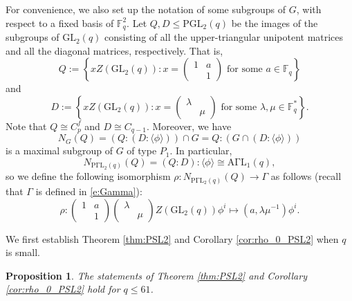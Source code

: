 \documentclass[twoside,a4paper,reqno,11pt]{amsart}
\newcommand{\<}{\langle}
\renewcommand{\>}{\rangle}
\newcommand{\la}{\langle}
\newcommand{\ra}{\rangle}
\renewcommand{\to}{\rightarrow}
\newcommand{\leqs}{\leqslant}
\newcommand{\GL}{\mathrm{GL}}
\newcommand{\PGL}{\mathrm{PGL}}
\newcommand{\PGammaL}{\mathrm{P\Gamma L}}
\newtheorem{prop}[thm]{Proposition}
\theoremstyle{definition}
\begin{document}
	For convenience, we also set up the notation of some subgroups of $G$, with respect to a fixed basis of $\mathbb{F}_q^2$. Let $Q,D\leqs \PGL_2(q)$ be the images of the subgroups of $\GL_2(q)$ consisting of all the upper-triangular unipotent matrices and all the diagonal matrices, respectively. That is,
	\begin{equation}
	\label{e:Q}
	Q:=\left\{xZ(\GL_2(q)):x =
	\begin{pmatrix}
	1&a\\
	&1
	\end{pmatrix}
	\mbox{ for some }a\in\mathbb{F}_q
	\right\}
	\end{equation}
	and
	\begin{equation}
	\label{e:D}
	D:=\left\{xZ(\GL_2(q)):x =
	\begin{pmatrix}
	\lambda&\\
	&\mu
	\end{pmatrix}
	\mbox{ for some }\lambda,\mu\in\mathbb{F}_q^*
	\right\}.
	\end{equation}
	Note that $Q\cong C_p^f$ and $D\cong C_{q-1}$. Moreover, we have
	\begin{equation*}
	N_{G}(Q) = (Q{:}(D{:}\la \phi\ra))\cap G = Q{:}(G\cap (D{:}\la \phi\ra))
	\end{equation*}
	is a maximal subgroup of $G$ of type $P_1$. In particular,
	\begin{equation*}
	N_{\PGammaL_2(q)}(Q) = (Q{:}D){:}\la\phi\ra\cong\mathrm{A\Gamma L}_1(q),
	\end{equation*}
	so we define the following isomorphism $\rho:N_{\PGammaL_2(q)}(Q)\to \Gamma$ as follows (recall that $\Gamma$ is defined in \eqref{e:Gamma}):
	\begin{equation}
	\label{e:pi}
	\rho:
	\begin{pmatrix}
	1&a\\
	&1
	\end{pmatrix}
	\begin{pmatrix}
	\lambda&\\
	&\mu
	\end{pmatrix}
	Z(\GL_2(q))\phi^i\mapsto (a,\lambda\mu^{-1})\phi^i.
	\end{equation}
	
	We first establish Theorem \ref{thm:PSL2} and Corollary \ref{cor:rho_0_PSL2} when $q$ is small.
	
	\begin{prop}
		\label{p:PSL2_61}
		The statements of Theorem \ref{thm:PSL2} and Corollary \ref{cor:rho_0_PSL2} hold for $q\leqs 61$.
	\end{prop}
	
\end{document}
